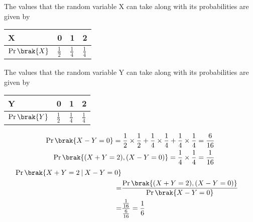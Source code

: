 The values that the random variable X can take along with its probabilities are given by
\begin{table}[h]
\centering
\begin{tabular}{|l|l|l|l|}
\hline
X             & 0             & 1             & 2             \\ \hline
$\Pr\brak{X}$ & $\frac{1}{2}$ & $\frac{1}{4}$ & $\frac{1}{4}$ \\ \hline
\end{tabular}
\end{table}
\newline
The values that the random variable Y can take along with its probabilities are given by
\begin{table}[h]
\centering
\begin{tabular}{|l|l|l|l|}
\hline
Y             & 0             & 1             & 2             \\ \hline
$\Pr\brak{Y}$ & $\frac{1}{2}$ & $\frac{1}{4}$ & $\frac{1}{4}$ \\ \hline
\end{tabular}
\end{table}
\begin{align}
\Pr\brak{X-Y=0}=\frac{1}{2}\times\frac{1}{2}+\frac{1}{4}\times\frac{1}{4}+\frac{1}{4}\times\frac{1}{4}=\frac{6}{16}\\
\Pr\brak{(X+Y=2),(X-Y=0)}=\frac{1}{4}\times\frac{1}{4}=\frac{1}{16}
\end{align}
\begin{align}
\Pr\brak{X+Y=2\:|\:X-Y=0}\notag\\
=&\frac{\Pr\brak{(X+Y=2),(X-Y=0)}}{\Pr\brak{X-Y=0}}\notag\\
=&\frac{\frac{1}{16}}{\frac{6}{16}}=\frac{1}{6}
\end{align}